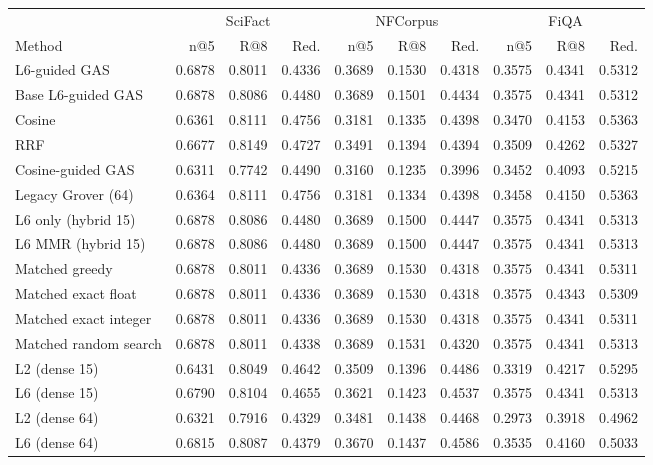 \begin{tabular}{lrrrrrrrrr}
\toprule
& \multicolumn{3}{c}{SciFact} & \multicolumn{3}{c}{NFCorpus} & \multicolumn{3}{c}{FiQA}\\
Method & n@5 & R@8 & Red. & n@5 & R@8 & Red. & n@5 & R@8 & Red.\\
\midrule
L6-guided GAS & 0.6878 & 0.8011 & 0.4336 & 0.3689 & 0.1530 & 0.4318 & 0.3575 & 0.4341 & 0.5312\\
Base L6-guided GAS & 0.6878 & 0.8086 & 0.4480 & 0.3689 & 0.1501 & 0.4434 & 0.3575 & 0.4341 & 0.5312\\
Cosine & 0.6361 & 0.8111 & 0.4756 & 0.3181 & 0.1335 & 0.4398 & 0.3470 & 0.4153 & 0.5363\\
RRF & 0.6677 & 0.8149 & 0.4727 & 0.3491 & 0.1394 & 0.4394 & 0.3509 & 0.4262 & 0.5327\\
Cosine-guided GAS & 0.6311 & 0.7742 & 0.4490 & 0.3160 & 0.1235 & 0.3996 & 0.3452 & 0.4093 & 0.5215\\
Legacy Grover (64) & 0.6364 & 0.8111 & 0.4756 & 0.3181 & 0.1334 & 0.4398 & 0.3458 & 0.4150 & 0.5363\\
L6 only (hybrid 15) & 0.6878 & 0.8086 & 0.4480 & 0.3689 & 0.1500 & 0.4447 & 0.3575 & 0.4341 & 0.5313\\
L6 MMR (hybrid 15) & 0.6878 & 0.8086 & 0.4480 & 0.3689 & 0.1500 & 0.4447 & 0.3575 & 0.4341 & 0.5313\\
Matched greedy & 0.6878 & 0.8011 & 0.4336 & 0.3689 & 0.1530 & 0.4318 & 0.3575 & 0.4341 & 0.5311\\
Matched exact float & 0.6878 & 0.8011 & 0.4336 & 0.3689 & 0.1530 & 0.4318 & 0.3575 & 0.4343 & 0.5309\\
Matched exact integer & 0.6878 & 0.8011 & 0.4336 & 0.3689 & 0.1530 & 0.4318 & 0.3575 & 0.4341 & 0.5311\\
Matched random search & 0.6878 & 0.8011 & 0.4338 & 0.3689 & 0.1531 & 0.4320 & 0.3575 & 0.4341 & 0.5313\\
L2 (dense 15) & 0.6431 & 0.8049 & 0.4642 & 0.3509 & 0.1396 & 0.4486 & 0.3319 & 0.4217 & 0.5295\\
L6 (dense 15) & 0.6790 & 0.8104 & 0.4655 & 0.3621 & 0.1423 & 0.4537 & 0.3575 & 0.4341 & 0.5313\\
L2 (dense 64) & 0.6321 & 0.7916 & 0.4329 & 0.3481 & 0.1438 & 0.4468 & 0.2973 & 0.3918 & 0.4962\\
L6 (dense 64) & 0.6815 & 0.8087 & 0.4379 & 0.3670 & 0.1437 & 0.4586 & 0.3535 & 0.4160 & 0.5033\\
\bottomrule
\end{tabular}
